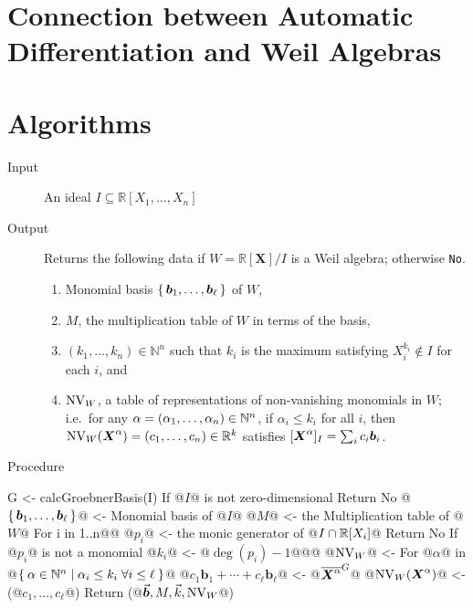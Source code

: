 \documentclass[%
  sigconf,authorversion,screen]{acmart}
\begin{document}
\section{Connection between Automatic Differentiation and Weil Algebras}
\label{sec:ad-and-weils}

\section{Algorithms}\label{sec:alg}

\begin{algorithm}\label{alg:weil-test}
  \hspace{1em}\vspace{-.25em}
  \begin{description}
    \item[Input] An ideal $I \subseteq \mathbb{R}[X_1, \dots, X_n]$
    \item[Output] Returns the following data if $W = \mathbb{R}[\boldsymbol{X}]/I$ is a Weil algebra; otherwise \verb|No|.
    \begin{enumerate}
      \item Monomial basis $\set{\boldsymbol{b}_1, \dots, \boldsymbol{b}_\ell}$ of $W$,
      \item $M$, the multiplication table of $W$ in terms of the basis,
      \item $(k_1, \dots, k_n) \in \mathbb{N}^n$ such that $k_i$ is the maximum satisfying $X_i^{k_i} \notin I$ for each $i$, and
      \item $\operatorname{NV}_W$, a table of representations of non-vanishing monomials in $W$;
      i.e.\ for any $\alpha = (\alpha_1, \dots, \alpha_n) \in \mathbb{N}^n$, if $\alpha_i \leq k_i$ for all $i$, then $\operatorname{NV}_W(\boldsymbol{X}^\alpha) = (c_1, \dots, c_n) \in \mathbb{R}^k$ satisfies $[\boldsymbol{X}^\alpha]_I = \sum_i c_i \boldsymbol{b}_i$.
    \end{enumerate} 
    \item[Procedure]
  \end{description}

  \begin{alg}
G <- calcGroebnerBasis(I)
If @$I$@ is not zero-dimensional
  Return No
@$\set{\boldsymbol{b}_1, \dots, \boldsymbol{b}_\ell}$@ <- Monomial basis of @$I$@
@$M$@ <- the Multiplication table of @$W$@
For i in 1..n@\label{line:weil-test:radical-start}@
  @$p_i$@ <- the monic generator of @$I \cap \mathbb{R}[X_i]$@
  Return No If @$p_i$@ is not a monomial
  @$k_i$@ <- @$\deg(p_i) - 1$@@\label{line:weil-test:radical-end}@
@$\operatorname{NV}_W$@ <- {}
For @$\alpha$@ in @$\Set{\alpha \in \mathbb{N}^n | \alpha_i \leq k_i \; \forall i \leq \ell}$@
  @$c_1 \boldsymbol{b}_1 + \cdots + c_\ell \boldsymbol{b}_\ell$@ <- @${\overline{\boldsymbol{X}^\alpha}}^{G}$@
  @$\operatorname{NV}_W(\boldsymbol{X}^\alpha)$@ <- (@$c_1, \dots, c_\ell$@)
Return (@$\vec{\boldsymbol{b}}, M, \vec{k}, \operatorname{NV}_W$@)
\end{alg}
\end{algorithm}
\end{document}
